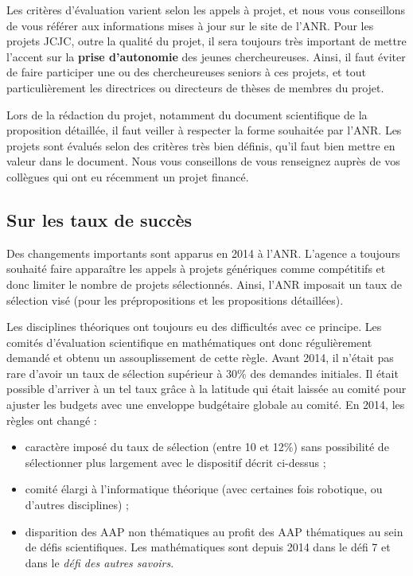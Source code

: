 Les crit\`eres d'\'evaluation varient selon les appels \`a projet, et nous vous conseillons de vous r\'ef\'erer aux informations mises \`a jour sur le site de l'ANR. Pour les projets JCJC, outre la qualit\'e du projet, il sera toujours tr\`es important de mettre l'accent sur la {\bf prise d'autonomie} des jeunes chercheur\mp euse\mp s. Ainsi, il faut \'eviter de faire participer un\mp e ou des chercheur\mp euse\mp s seniors \`a ces projets, et tout particuli\`erement les directrices ou directeurs de th\`eses de membres du projet.

Lors de la r\'edaction du projet, notamment du document scientifique de la proposition d\'etaill\'ee, il faut veiller \`a respecter la forme souhait\'ee par l'ANR. Les projets sont \'evalu\'es selon des crit\`eres tr\`es bien d\'efinis, qu'il faut bien mettre en valeur dans le document. Nous vous conseillons de vous renseignez aupr\`es de vos coll\`egues qui ont eu r\'ecemment un projet financ\'e.

\subsection*{Sur les taux de succ\`es}

Des changements importants sont apparus en 2014 \`a l'ANR. L'agence a toujours souhait\'e faire appara\^itre les appels \`a projets g\'en\'eriques comme comp\'etitifs et donc limiter le nombre de projets s\'electionn\'es. Ainsi, l'ANR imposait un taux de s\'election vis\'e (pour les pr\'epropositions et les propositions d\'etaill\'ees).

Les disciplines th\'eoriques ont toujours eu des difficult\'es avec ce principe. Les comit\'es d'\'evaluation scientifique en math\'ematiques ont donc r\'eguli\`erement demand\'e et obtenu un assouplissement de cette r\`egle. Avant 2014, il n'\'etait pas rare d'avoir un taux de s\'election sup\'erieur \`a 30\% des demandes initiales. Il \'etait possible d'arriver \`a un tel taux gr\^ace \`a la latitude qui \'etait laiss\'ee au comit\'e pour ajuster les budgets avec une enveloppe budg\'etaire globale au comit\'e. En 2014, les r\`egles ont chang\'e :

\begin{itemize}
\item caract\`ere impos\'e du taux de s\'election (entre 10 et 12\%) sans possibilit\'e de s\'electionner plus largement avec le dispositif d\'ecrit ci-dessus ;
\item comit\'e \'elargi \`a l'informatique th\'eorique (avec certaines fois robotique, ou d'autres disciplines) ;
\item disparition des AAP non th\'ematiques au profit des AAP th\'ematiques au sein de d\'efis scientifiques. Les math\'ematiques sont depuis 2014 dans le d\'efi 7 et dans le {\em d\'efi des autres savoirs}.
\end{itemize}

